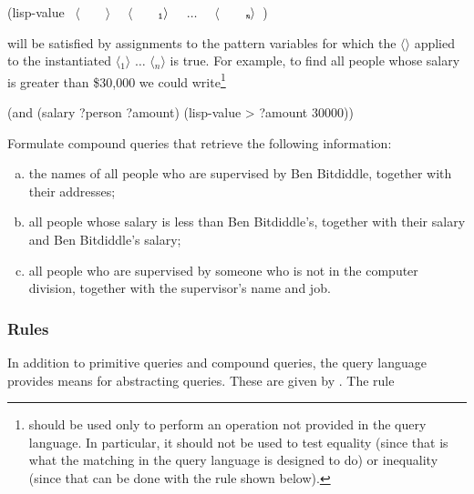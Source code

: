 \begin{codeBlock}
(lisp-value ~\(\langle \)~~~~\(\rangle \)~ ~\(\langle \)~~~~\(_{\mono{1}}\rangle \)~ ~\( \dots \)~ ~\(\langle \)~~~~\(_{\monoItalic{n}}\rangle \)~)
\end{codeBlock}

\noindent
will be satisfied by assignments to the pattern variables for which the
\( \langle \)\( \rangle \) applied to the instantiated \( \langle \)\( _1\rangle \) \( \dots \)
\( \langle \)\( _n\rangle \) is true.  For example, to find all people whose salary is
greater than \$30,000 we could write\footnote{ should be used
only to perform an operation not provided in the query language.  In
particular, it should not be used to test equality (since that is what the
matching in the query language is designed to do) or inequality (since that can
be done with the  rule shown below).}

\begin{codeBlock}
(and (salary ?person ?amount) (lisp-value > ?amount 30000))
\end{codeBlock}

\begin{exerciseGroup}
\label{Exercise 4.56}
 Formulate compound queries that
retrieve the following information:

\begin{enumerate}[a.]

\item
the names of all people who are supervised by Ben Bitdiddle, together with
their addresses;

\item
all people whose salary is less than Ben Bitdiddle's, together with their
salary and Ben Bitdiddle's salary;

\item
all people who are supervised by someone who is not in the computer division,
together with the supervisor's name and job.

\end{enumerate}
\end{exerciseGroup}

\subsubsection*{Rules}

In addition to primitive queries and compound queries, the query language
provides means for abstracting queries.  These are given by .
The rule

